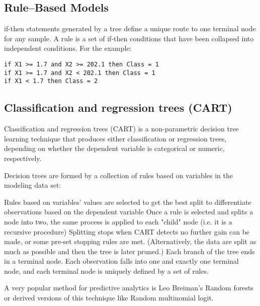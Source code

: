 \documentclass[caret-main.tex]{subfiles}
\begin{document}


\subsection{Rule–Based Models}
if-then statements generated by a tree deﬁne a unique route to one
terminal node for any sample.
A rule is a set of if-then conditions that have been collapsed into
independent conditions.
For the example:
\begin{verbatim}
if X1 >= 1.7 and X2 >= 202.1 then Class = 1
if X1 >= 1.7 and X2 < 202.1 then Class = 1
if X1 < 1.7 then Class = 2
\end{verbatim}

\newpage
\subsection{Classification and regression trees (CART) }
Classification and regression trees (CART) is a non-parametric decision tree learning technique that produces either classification or regression trees, depending on whether the dependent variable is categorical or numeric, respectively.

Decision trees are formed by a collection of rules based on variables in the modeling data set:

Rules based on variables' values are selected to get the best split to differentiate observations based on the dependent variable
Once a rule is selected and splits a node into two, the same process is applied to each "child" node (i.e. it is a recursive procedure)
Splitting stops when CART detects no further gain can be made, or some pre-set stopping rules are met. (Alternatively, the data are split as much as possible and then the tree is later pruned.)
Each branch of the tree ends in a terminal node. Each observation falls into one and exactly one terminal node, and each terminal node is uniquely defined by a set of rules.

A very popular method for predictive analytics is Leo Breiman's Random forests or derived versions of this technique like Random multinomial logit.

\end{document}

